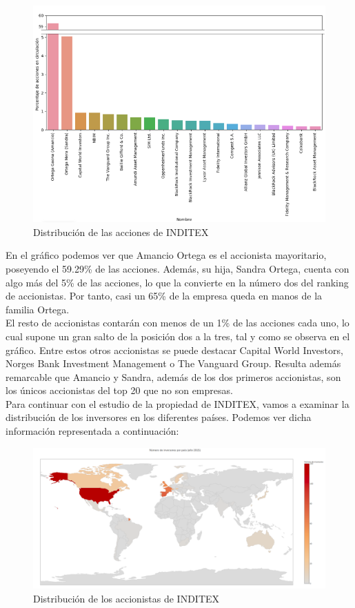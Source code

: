 \documentclass[11pt]{article}
\theoremstyle{plain}
\theoremstyle{definition}
\begin{document}
\begin{figure}[H]
  \centering
  \includegraphics[width=.85\textwidth]{graphs/barplot_finished.png}
  \caption{Distribución de las acciones de INDITEX}
\end{figure}


En el gráfico podemos ver que Amancio Ortega es el accionista
mayoritario, poseyendo el 59.29\% de las acciones. Además, su hija,
Sandra Ortega, cuenta con algo más del 5\% de las acciones, lo que la
convierte en la número dos del ranking de accionistas. Por tanto, casi
un 65\% de la empresa
queda en manos de la familia Ortega.\\

El resto de accionistas contarán con menos de un 1\% de las acciones
cada uno, lo cual supone un gran salto de la posición dos a la tres,
tal y como se observa en el gráfico. Entre estos otros accionistas se
puede destacar Capital World Investors, Norges Bank Investment
Management o The Vanguard Group. Resulta además remarcable que Amancio
y Sandra, además de los dos primeros accionistas, son los
únicos accionistas del top 20 que no son empresas.\\


Para continuar con el estudio de la propiedad de INDITEX, vamos a
examinar la distribución de los inversores en los diferentes
países. Podemos ver dicha información representada a continuación:

\begin{figure}[H]
  \centering \includegraphics[width=\textwidth]{graphs/worldmap.png}
  \caption{Distribución de los accionistas de INDITEX}
\end{figure}
\end{document}
